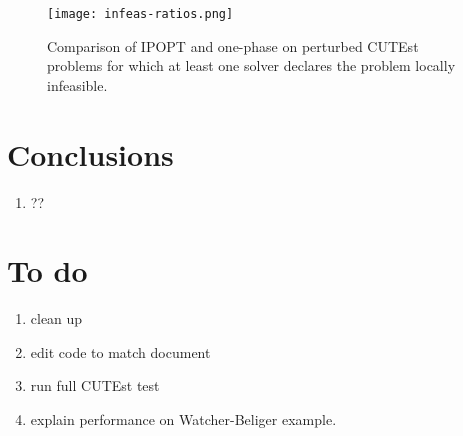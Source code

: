 \documentclass{article}
\begin{document}
\begin{figure}[H]
\texttt{[image: infeas-ratios.png]}
\caption{Comparison of IPOPT and one-phase on perturbed CUTEst problems for which at least one solver declares the problem locally infeasible.}\label{fig:comparison-IPOPT-on-perturbed-CUTEst}
\end{figure}

%
%
%
%


\section{Conclusions}
\begin{enumerate}
\item ??
\end{enumerate}


\section{To do}

\begin{enumerate}
\item clean up 
\item edit code to match document
\item run full CUTEst test
\item explain performance on Watcher-Beliger example.
\end{enumerate}




\appendix
\end{document}
